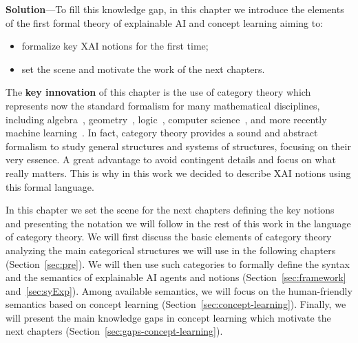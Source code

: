 \textbf{Solution}---To fill this knowledge gap, in this chapter we introduce the elements of the first formal theory of explainable AI and concept learning aiming to:
\begin{itemize}
    \item formalize key XAI notions for the first time;
    \item set the scene and motivate the work of the next chapters.
\end{itemize}
The \textbf{key innovation} of this chapter is the use of category theory which represents now the standard formalism for many mathematical disciplines, including algebra~\cite{eilenberg1945general}, geometry~\cite{bredon2012sheaf}, logic~\cite{johnstone2014topos}, computer science~\cite{goguen1992institutions}, and more recently machine learning~\cite{cruttwell2022categorical,ong2022learnable}.
In fact, category theory provides a sound and abstract formalism to study general structures and systems of structures, focusing on their very essence. A great advantage to avoid contingent details and focus on what really matters. This is why in this work we decided to describe XAI notions using this formal language.

In this chapter we set the scene for the next chapters defining the key notions and presenting the notation we will follow in the rest of this work in the language of category theory. We will first discuss the basic elements of category theory analyzing the main categorical structures we will use in the following chapters (Section~\ref{sec:pre}). We will then use such categories to formally define the syntax and the semantics of explainable AI agents and notions (Section~\ref{sec:framework} and~\ref{sec:syExp}). Among available semantics, we will focus on the human-friendly semantics based on concept learning (Section~\ref{sec:concept-learning}). Finally, we will present the main knowledge gaps in concept learning which motivate the next chapters (Section~\ref{sec:gaps-concept-learning}).



